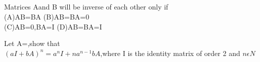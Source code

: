   \item{}\\
  \solution
  
  
  \item {}\\
  \solution
  
  \item{}\\
  \item{}\\
  \item{}\\
  \item {}\\
  \item {}\\
  \item {}\\
  \item {}\\
  \item {}\\
  \item {}\\
  \item {}\\
  \item {}\\
  \item {}\\
  
  \item Matrices Aand B will be inverse of each other only if\\
  (A)AB=BA (B)AB=BA=0\\
  (C)AB=0,BA=I (D)AB=BA=I\\
  
  \item Let A=,show that \\$(aI+bA)^{n}=a^{n}I+na^{n-1}bA$,where I is the identity matrix of order 2 and $n \epsilon N$\\

